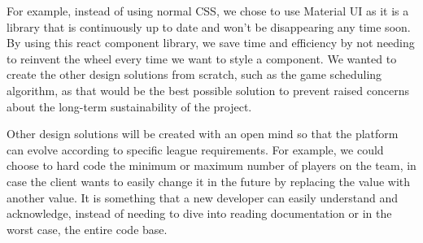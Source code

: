 \documentclass[12pt, titlepage]{article}
\begin{document}
\begin{enumerate}
        For example, instead of using normal CSS, we chose to use Material UI as it is a library that is continuously up to date and won’t be disappearing any time soon. By using this react component library, we save time and efficiency by not needing to reinvent the wheel every time we want to style a component. We wanted to create the other design solutions from scratch, such as the game scheduling algorithm, as that would be the best possible solution to prevent raised concerns about the long-term sustainability of the project.

        Other design solutions will be created with an open mind so that the platform can evolve according to specific league requirements. For example, we could choose to hard code the minimum or maximum number of players on the team, in case the client wants to easily change it in the future by replacing the value with another value. It is something that a new developer can easily understand and acknowledge, instead of needing to dive into reading documentation or in the worst case, the entire code base.
\end{enumerate}
\end{document}

